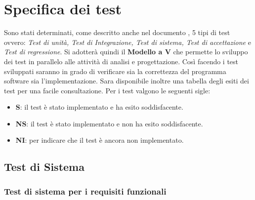 \section{Specifica dei test}

Sono stati determinati, come descritto anche nel documento \NdP , 5 tipi di test ovvero: 
\textit{Test di unità, Test di Integrazione, Test di sistema, Test di accettazione} e \textit{Test di regressione}. 
Si adotterà quindi il \textbf{Modello a V} che permette lo sviluppo dei test in parallelo alle attività di analisi e progettazione. 
Così facendo i test sviluppati saranno in grado di verificare sia la correttezza del programma software sia l'implementazione. 
Sara disponibile inoltre una tabella degli esiti dei test per una facile consultazione.
Per i test valgono le seguenti sigle:

    \begin{itemize}
        \item \textbf{S}: il test è stato implementato e ha esito soddisfacente.
        \item \textbf{NS}: il test è stato implementato e non ha esito soddisfacente.
        \item \textbf{NI}: per indicare che il test è ancora non implementato.
    \end{itemize}
 
\subsection{Test di Sistema}
\subsubsection{Test di sistema per i requisiti funzionali}
    \hphantom{}

